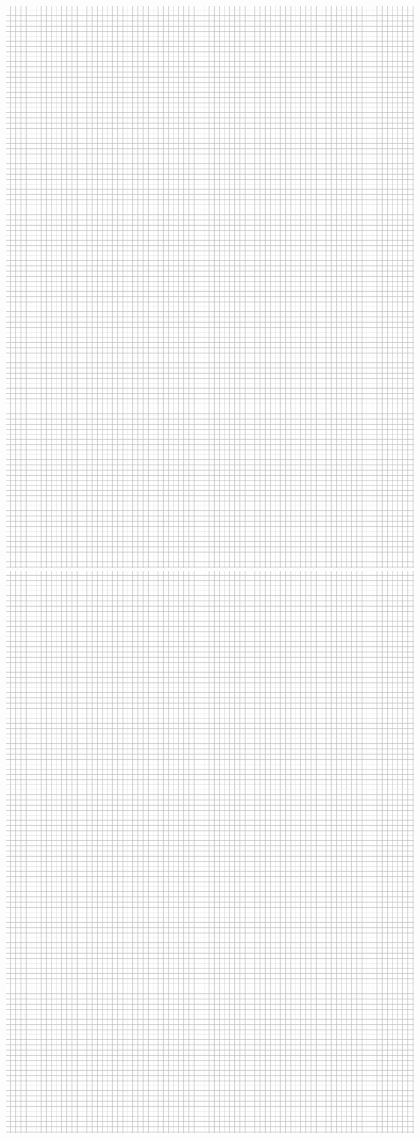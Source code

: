 \documentclass[12pt]{article}
\begin{document}
\includegraphics[width=\textwidth]{graphpaper.png}
\newpage
\includegraphics[width=\textwidth]{graphpaper.png}
\end{document}
